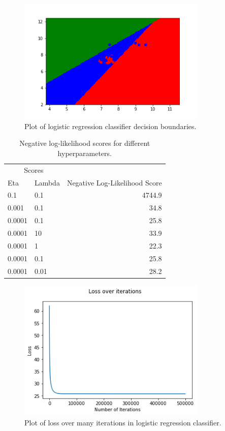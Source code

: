 \documentclass[submit]{harvardml}
\begin{document}
\begin{figure}[h]
\centering
\includegraphics[width=0.8\textwidth]{logistic_regression_result}
\caption{Plot of logistic regression classifier decision boundaries.}
\label{fig:1.3}
\end{figure}

\begin{table}
\centering
\begin{tabular}{llr}
 \multicolumn{2}{c}{Scores} \\
 Eta & Lambda & Negative Log-Likelihood Score \\
 0.1 & 0.1 & 4744.9\\
 0.001 & 0.1 & 34.8 \\
 0.0001 & 0.1 & 25.8  \\
 0.0001 & 10 & 33.9  \\
 0.0001 & 1 & 22.3  \\
 0.0001 & 0.1 & 25.8  \\
 0.0001 & 0.01 & 28.2  \\
\end{tabular}
\caption{\label{tab:results} Negative log-likelihood scores for different hyperparameters.}
\end{table}


\begin{figure}[h]
\centering
\includegraphics[width=0.8\textwidth]{h2_figure4}
\caption{Plot of loss over many iterations in logistic regression classifier.}
\label{fig:1.4}
\end{figure}
\end{document}
